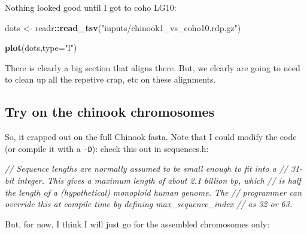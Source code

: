 \documentclass[]{krantz}
\makeatletter
\newenvironment{Shaded}{\begin{snugshade}}{\end{snugshade}}
\newcommand{\BuiltInTok}[1]{#1}
\newcommand{\CommentTok}[1]{\textcolor[rgb]{0.37,0.37,0.37}{\textit{#1}}}
\newcommand{\DataTypeTok}[1]{\textcolor[rgb]{0.27,0.27,0.27}{#1}}
\newcommand{\ExtensionTok}[1]{#1}
\newcommand{\FunctionTok}[1]{\textcolor[rgb]{0,0,0}{#1}}
\newcommand{\KeywordTok}[1]{\textcolor[rgb]{0.27,0.27,0.27}{\textbf{#1}}}
\newcommand{\NormalTok}[1]{#1}
\newcommand{\OperatorTok}[1]{\textcolor[rgb]{0.43,0.43,0.43}{\textbf{#1}}}
\newcommand{\StringTok}[1]{\textcolor[rgb]{0.5,0.5,0.5}{#1}}
\newcommand{\VariableTok}[1]{\textcolor[rgb]{0,0,0}{#1}}
\newenvironment{kframe}{%
\medskip{}
\setlength{\fboxsep}{.8em}
 \def\at@end@of@kframe{}%
 \ifinner\ifhmode%
  \def\at@end@of@kframe{\end{minipage}}%
  \begin{minipage}{\columnwidth}%
 \fi\fi%
 \def\FrameCommand##1{\hskip\@totalleftmargin \hskip-\fboxsep
 \colorbox{shadecolor}{##1}\hskip-\fboxsep
     \hskip-\linewidth \hskip-\@totalleftmargin \hskip\columnwidth}%
 \MakeFramed {\advance\hsize-\width
   \@totalleftmargin\z@ \linewidth\hsize
   \@setminipage}}%
 {\par\unskip\endMakeFramed%
 \at@end@of@kframe}
\renewenvironment{Shaded}{\begin{kframe}}{\end{kframe}}
\makeatother
\begin{document}
Nothing looked good until I got to coho LG10:

\begin{Shaded}
\begin{Highlighting}[]
\NormalTok{dots <-}\StringTok{ }\NormalTok{readr}\OperatorTok{::}\KeywordTok{read_tsv}\NormalTok{(}\StringTok{"inputs/chinook1_vs_coho10.rdp.gz"}\NormalTok{)}

\KeywordTok{plot}\NormalTok{(dots,}\DataTypeTok{type=}\StringTok{"l"}\NormalTok{)}
\end{Highlighting}
\end{Shaded}

There is clearly a big section that aligns there. But, we clearly are going to need to
clean up all the repetive crap, etc on these alignments.

\hypertarget{try-on-the-chinook-chromosomes}{%
\subsection{Try on the chinook chromosomes}\label{try-on-the-chinook-chromosomes}}

So, it crapped out on the full Chinook fasta. Note that I could modify the code (or compile it with a \texttt{-D}): check this out in sequences.h:

\begin{Shaded}
\begin{Highlighting}[]
\CommentTok{//  Sequence lengths are normally assumed to be small enough to fit into a}
\CommentTok{//  31-bit integer.  This gives a maximum length of about 2.1 billion bp, which}
\CommentTok{//  is half the length of a (hypothetical) monoploid human genome.  The}
\CommentTok{//  programmer can override this at compile time by defining max_sequence_index}
\CommentTok{//  as 32 or 63.}
\end{Highlighting}
\end{Shaded}

But, for now, I think I will just go for the assembled chromosomes only:

\begin{Shaded}
\end{Shaded}
\end{document}
